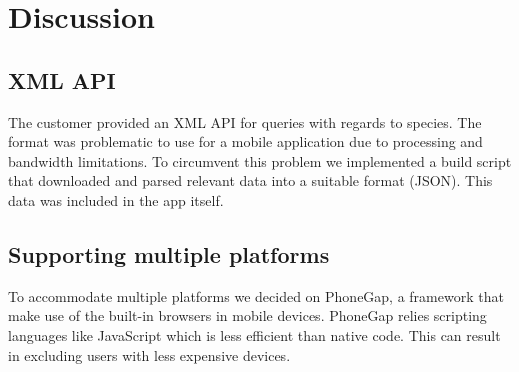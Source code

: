 \section{Discussion}

\subsection{XML API}

The customer provided an XML API for queries with regards to species. The
format was problematic to use for a mobile application due to processing and
bandwidth limitations. To circumvent this problem we implemented a build script
that downloaded and parsed relevant data into a suitable format (JSON). This data
was included in the app itself.

\subsection{Supporting multiple platforms}

To accommodate multiple platforms we decided on PhoneGap, a framework that make
use of the built-in browsers in mobile devices. PhoneGap relies scripting
languages like JavaScript which is less efficient than native code. This can
result in excluding users with less expensive devices.
